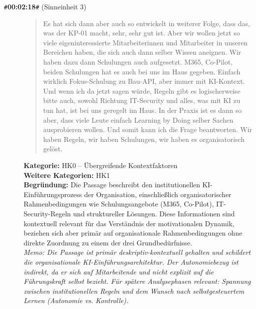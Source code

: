 \begin{description}
  \item[\texttt{\#}\textbf{00:02:18}\texttt{\#} (Sinneinheit 3)]
  \begin{quote}
  Es hat sich dann aber auch so entwickelt in weiterer Folge, dass das, was der KP-01 macht, sehr, sehr gut ist. Aber wir wollen jetzt so viele eigeninteressierte Mitarbeiterinnen und Mitarbeiter in unseren Bereichen haben, die sich auch dann selber Wissen aneignen. Wir haben dazu dann Schulungen auch aufgesetzt. M365, Co-Pilot, beiden Schulungen hat es auch bei uns im Haus gegeben. Einfach wirklich Fokus-Schulung zu Bau-API, aber immer mit KI-Kontext. Und wenn ich da jetzt sagen würde, Regeln gibt es logischerweise bitte auch, sowohl Richtung IT-Security und alles, was mit KI zu tun hat, ist bei uns geregelt im Haus. In der Praxis ist es dann so aber, dass viele Leute einfach Learning by Doing selber Sachen ausprobieren wollen. Und somit kann ich die Frage beantworten. Wir haben Regeln, wir haben Schulungen, wir haben es organisatorisch gelöst.
  \end{quote}
  \textbf{Kategorie:} HK0 -- Übergreifende Kontextfaktoren\\
  \textbf{Weitere Kategorien:} HK1\\
  \textbf{Begr\"undung:} Die Passage beschreibt den institutionellen KI-Einführungsprozess der Organisation, einschließlich organisatorischer Rahmenbedingungen wie Schulungsangebote (M365, Co-Pilot), IT-Security-Regeln und struktureller Lösungen. Diese Informationen sind kontextuell relevant für das Verständnis der motivationalen Dynamik, beziehen sich aber primär auf organisationale Rahmenbedingungen ohne direkte Zuordnung zu einem der drei Grundbedürfnisse.
  \\\textit{Memo: Die Passage ist primär deskriptiv-kontextuell gehalten und schildert die organisationale KI-Einführungsarchitektur. Der Autonomiebezug ist indirekt, da er sich auf Mitarbeitende und nicht explizit auf die Führungskraft selbst bezieht. Für spätere Analysephasen relevant: Spannung zwischen institutionellen Regeln und dem Wunsch nach selbstgesteuertem Lernen (Autonomie vs. Kontrolle).}
\end{description}
\medskip

